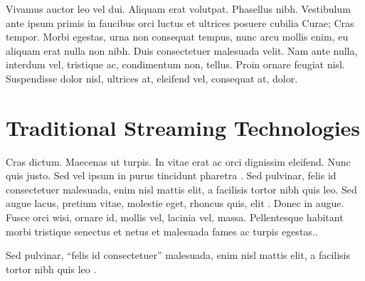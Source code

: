 \label{chap:back}

Vivamus auctor leo vel dui. Aliquam erat volutpat. Phasellus nibh. Vestibulum ante ipsum primis in faucibus orci luctus et ultrices posuere cubilia Curae; Cras tempor. Morbi egestas, urna non consequat tempus, nunc arcu mollis enim, eu aliquam erat nulla non nibh. Duis consectetuer malesuada velit. Nam ante nulla, interdum vel, tristique ac, condimentum non, tellus. Proin ornare feugiat nisl. Suspendisse dolor nisl, ultrices at, eleifend vel, consequat at, dolor.
\section{Traditional Streaming Technologies}
Cras dictum. Maecenas ut turpis. In vitae erat ac orci dignissim eleifend. Nunc quis justo. Sed vel ipsum in purus tincidunt pharetra \cite{MacAulay:2005fk}. Sed pulvinar, felis id consectetuer malesuada, enim nisl mattis elit, a facilisis tortor nibh quis leo. Sed augue lacus, pretium vitae, molestie eget, rhoncus quis, elit \cite{Schwarz:2007lr}. Donec in augue. Fusce orci wisi, ornare id, mollis vel, lacinia vel, massa. Pellentesque habitant morbi tristique senectus et netus et malesuada fames ac turpis egestas..

Sed pulvinar, \enquote{felis id consectetuer} malesuada, enim nisl mattis elit, a facilisis tortor nibh quis leo .


